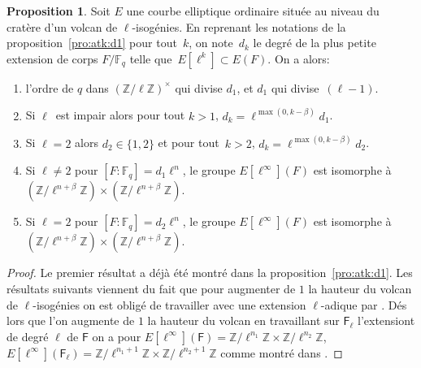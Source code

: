 \documentclass[10pt,a4paper]{book}
\theoremstyle{plain}
\theoremstyle{definition}
\theoremstyle{definition}
\theoremstyle{definition}
\newtheorem{prop}[thm]{Proposition}
\theoremstyle{definition}
\theoremstyle{remark}
\theoremstyle{remark}
\theoremstyle{definition}
\begin{document}
\begin{prop}\label{pro:clas:fro:atk}
Soit $E$ une courbe elliptique ordinaire située au niveau du cratère d'un 
volcan de $\ell$-isogénies. En reprenant les notations de la 
proposition~\ref{pro:atk:d1} pour tout~$k$, on note~$d_k$ le degré de la plus 
petite extension de corps $F/\mathbb{F}_q$ telle que~$E[\ell^k]\subset E(F)$. 
On  a alors:
\begin{enumerate}
\item l'ordre de $q$ dans $(\mathbb{Z}/ \ell \mathbb{Z})^\times$ qui divise $d_1$,
et $d_1$ qui divise~$(\ell-1)$.
\item Si $\ell$~est impair alors pour tout $k > 1$,
$ d_k = \ell^{\max (0, k - \beta)}d_1$.
\item Si $\ell=2$ alors $d_2 \in \{1,2\}$ et pour tout~$k > 2$,
$d_k = \ell^{\max (0, k - \beta)}d_2$.
\item Si $\ell \neq 2$ pour $[F:\mathbb{F}_q]=d_1\ell^n$, le groupe $E[\ell^{\infty}](F)$ est isomorphe à~$(\mathbb{Z}/\ell^{n+\beta} \mathbb{Z}) \times (\mathbb{Z}/\ell^{n+\beta} \mathbb{Z})$.
\item Si $\ell = 2$ pour $[F:\mathbb{F}_q]=d_2\ell^n$, le groupe $E[\ell^{\infty}](F)$ est isomorphe à~$(\mathbb{Z}/\ell^{n+\beta} \mathbb{Z}) \times (\mathbb{Z}/\ell^{n+\beta} \mathbb{Z})$.
\end{enumerate}
\end{prop}

\begin{proof}
Le premier résultat a déjà été montré dans la proposition~\ref{pro:atk:d1}.
Les résultats suivants viennent du fait que pour augmenter de $1$ la hauteur du
volcan de $\ell$-isogénies on est obligé de travailler avec une extension 
$\ell$-adique par \cite[Lemme 6.5.2]{Fouquet01}. Dés lors que l'on augmente de 
$1$ la hauteur du volcan en travaillant sur $\mathsf{F}_{\ell}$ l'extensiont de
degré $\ell$ de $\mathsf{F}$ on a pour $E[\ell^{\infty}](\mathsf{F})= \mathbb{Z}/
\ell^{n_1} \mathbb{Z} \times \mathbb{Z}/\ell^{n_2} \mathbb{Z}$, $E[\ell^{\infty}
](\mathsf{F}_{\ell})= \mathbb{Z}/\ell^{n_1+1} \mathbb{Z} \times \mathbb{Z}/\ell^{n_2+1} 
\mathbb{Z}$ comme montré dans \cite[§5.3.1]{Ionica2010}.
\end{proof}
\end{document}
